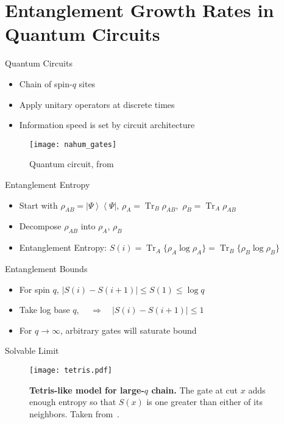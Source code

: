 \documentclass{beamer}
\newcommand{\imp}{\Longrightarrow\quad}
\newcommand{\ket}[1]{\left|#1\right\rangle}
\newcommand{\bra}[1]{\left\langle#1\right|}
\DeclareMathOperator{\Tr}{Tr}
\begin{document}
\section{Entanglement Growth Rates in Quantum Circuits}

\begin{frame}{Quantum Circuits}
\begin{itemize}
	\item Chain of spin-$q$ sites
	\item Apply unitary operators at discrete times
	\item Information speed is set by circuit architecture
\end{itemize}
\begin{figure}
	\centering
	\texttt{[image: nahum\_gates]}
	\caption{Quantum circuit, from \cite{Nahum2017}}
\end{figure}
\end{frame}

\begin{frame}{Entanglement Entropy}
\begin{itemize}
\item Start with $\rho_{AB}= \ket{\Psi}\bra{\Psi}$, $\rho_A = \Tr_B\rho_{AB},$ $\rho_B = \Tr_A\rho_{AB}$
\item Decompose $\rho_{AB}$ into $\rho_A$, $\rho_B$
\item Entanglement Entropy: $S(i) = \Tr_A\{\rho_A\log\rho_A\} =
\Tr_B\{\rho_B\log\rho_B\}$
\end{itemize}
\end{frame}

\begin{frame}{Entanglement Bounds}
\begin{itemize}
\item For spin $q$, $|S(i) - S(i+1)| \le S(1) \le \log q$
\item Take log base $q$, $\quad\imp |S(i) - S(i+1)| \le 1$
\item For $q\to\infty$, arbitrary gates will saturate bound \cite{Nahum2017}
\end{itemize}
\end{frame}

\begin{frame}{Solvable Limit}
\begin{figure}
\centering
\texttt{[image: tetris.pdf]}
\caption{\textbf{Tetris-like model for large-$q$ chain.} The gate at cut $x$ adds enough entropy so that $S(x)$ is one greater than either of its neighbors. Taken from~\cite{Nahum2017}.}
\label{fig:tetris}
\end{figure}
\end{frame}
\end{document}

